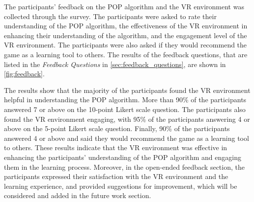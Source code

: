 The participants' feedback on the \ac{POP} algorithm and the \ac{VR} environment was collected through the survey. The participants were asked to rate their understanding of the \ac{POP} algorithm, the effectiveness of the \ac{VR} environment in enhancing their understanding of the algorithm, and the engagement level of the \ac{VR} environment. The participants were also asked if they would recommend the game as a learning tool to others. The results of the feedback questions, that are listed in the \textit{Feedback Questions} in \autoref{sec:feedback_questions}, are shown in \autoref{fig:feedback}.

The results show that the majority of the participants found the \ac{VR} environment helpful in understanding the \ac{POP} algorithm. More than 90\% of the participants answered 7 or above on the 10-point Likert scale question. The participants also found the \ac{VR} environment engaging, with 95\% of the participants answering 4 or above on the 5-point Likert scale question. Finally, 90\% of the participants answered 4 or above and said they would recommend the game as a learning tool to others. These results indicate that the \ac{VR} environment was effective in enhancing the participants' understanding of the \ac{POP} algorithm and engaging them in the learning process. Moreover, in the open-ended feedback section, the participants expressed their satisfaction with the \ac{VR} environment and the learning experience, and provided suggestions for improvement, which will be considered and added in the future work section.

